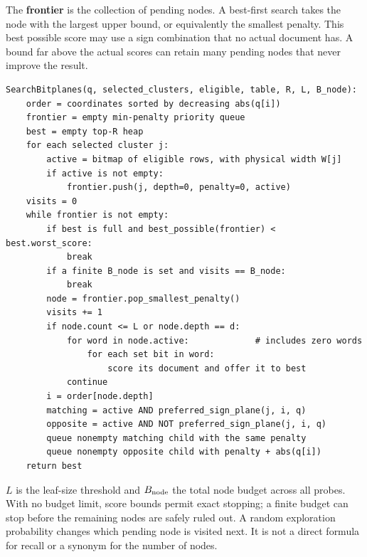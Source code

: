 The \textbf{frontier} is the collection of pending nodes. A best-first search takes the node
with the largest upper bound, or equivalently the smallest penalty. This best possible score may use
a sign combination that no actual document has. A bound far above the actual scores can retain
many pending nodes that never improve the result.

\par\noindent\begin{minipage}{\linewidth}
\begin{lstlisting}[caption={Dense bitplane search across the selected clusters.}]
SearchBitplanes(q, selected_clusters, eligible, table, R, L, B_node):
    order = coordinates sorted by decreasing abs(q[i])
    frontier = empty min-penalty priority queue
    best = empty top-R heap
    for each selected cluster j:
        active = bitmap of eligible rows, with physical width W[j]
        if active is not empty:
            frontier.push(j, depth=0, penalty=0, active)
    visits = 0
    while frontier is not empty:
        if best is full and best_possible(frontier) < best.worst_score:
            break
        if a finite B_node is set and visits == B_node:
            break
        node = frontier.pop_smallest_penalty()
        visits += 1
        if node.count <= L or node.depth == d:
            for word in node.active:             # includes zero words
                for each set bit in word:
                    score its document and offer it to best
            continue
        i = order[node.depth]
        matching = active AND preferred_sign_plane(j, i, q)
        opposite = active AND NOT preferred_sign_plane(j, i, q)
        queue nonempty matching child with the same penalty
        queue nonempty opposite child with penalty + abs(q[i])
    return best
\end{lstlisting}
\end{minipage}\par
$L$ is the leaf-size threshold and $B_{\rm node}$ the total node budget across all probes.
With no budget limit, score bounds permit exact stopping; a finite budget can stop before the
remaining nodes are safely ruled out. A random exploration probability changes which pending
node is visited next. It is not a direct formula for recall or a synonym for the number of nodes.

